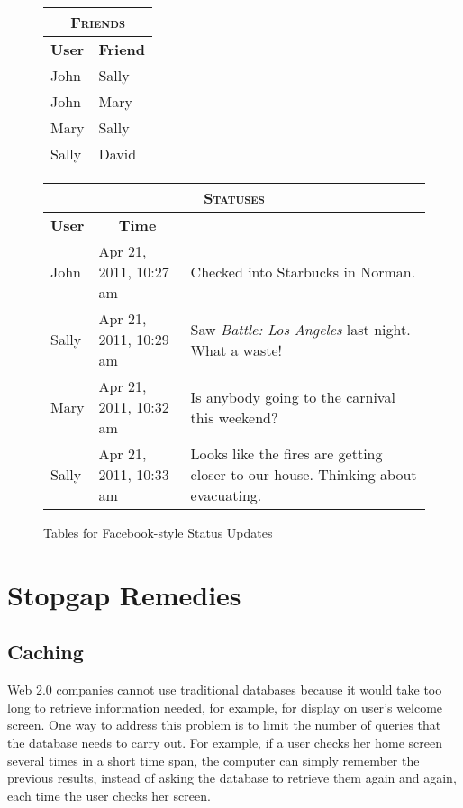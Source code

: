 \begin{figure}
	\begin{center}
		\begin{tabular}[t]{ll}
			\hline
			\multicolumn{2}{c}{\textsc{Friends}} \\
			\hline
			\multicolumn{1}{c}{\textbf{User}} & \multicolumn{1}{c}{\textbf{Friend}} \\
			\hline
			John  & Sally \\
			John  & Mary \\
			Mary  & Sally \\
			Sally & David \\
			\hline
		\end{tabular}
		\hspace{.5in}
		\begin{tabular}[t]{ll>{\raggedright}p{1in}}
			\hline
			\multicolumn{3}{c}{\textsc{Statuses}} \\
			\hline
			\multicolumn{1}{c}{\textbf{User}} & \multicolumn{1}{c}{\textbf{Time}} & \multicolumn{1}{c}{\textbf{Status}} \\
			\hline
			John  & Apr 21, 2011, 10:27 am & Checked into Starbucks in Norman. \tabularnewline
			Sally & Apr 21, 2011, 10:29 am & Saw \emph{Battle: Los Angeles} last night.  What a waste! \tabularnewline
			Mary  & Apr 21, 2011, 10:32 am & Is anybody going to the carnival this weekend? \tabularnewline
			Sally & Apr 21, 2011, 10:33 am & Looks like the fires are getting closer to our house.  Thinking about evacuating. \tabularnewline
			\hline
		\end{tabular}
	\end{center}
	\caption{Tables for Facebook-style Status Updates}
	\label{facebook-tables}
\end{figure}

\section{Stopgap Remedies}

\subsection{Caching}

Web 2.0 companies cannot use traditional databases
because it would take too long to retrieve information needed,
for example, for display on user's welcome screen.
One way to address this problem is to limit the number of queries that the
database needs to carry out.
For example, if a user checks her home screen several times in a short time span,
the computer can simply remember the previous results, instead of asking the database to
retrieve them again and again, each time the user checks her screen.

